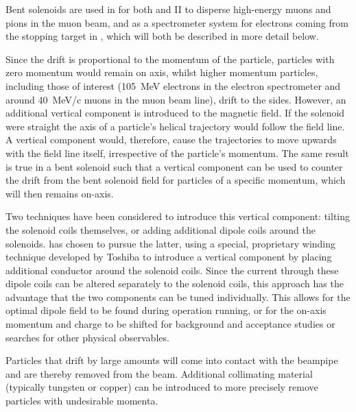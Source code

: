 Bent solenoids are used in \COMET for both \phaseI and II to disperse high-energy muons and pions in the muon
beam, and as a spectrometer system for electrons coming
from the stopping target in \phaseII, which will both be described in more
detail below.

Since the drift is proportional to the momentum of the particle, particles with zero momentum would remain on axis, whilst higher momentum particles, including those of interest (105~MeV electrons in the \phaseII electron spectrometer and around 40~MeV/c muons in the muon beam line), drift to the sides.  
However, an additional vertical component is introduced to the magnetic field.
If the solenoid were straight the axis of a particle's helical trajectory would follow the field line. 
A vertical component would, therefore, cause the trajectories to move upwards with the field line itself, irrespective of the particle's momentum.
The same result is true in a bent solenoid such that a vertical component can be used to 
counter the drift from the bent solenoid field for particles of a specific momentum, which will then remains on-axis.

Two techniques have been considered to introduce this vertical component: tilting the solenoid coils themselves, or adding additional dipole coils around the solenoids.
\COMET has chosen to pursue the latter, using a special, proprietary winding technique developed by Toshiba to introduce a vertical component by placing additional conductor around the solenoid coils.
Since the current through these dipole coils can be altered separately to the solenoid coils, this approach has the advantage that the two components can be tuned individually.
This allows for the optimal dipole field to be found during operation running, or for the on-axis momentum and charge to be shifted for background and acceptance studies or searches for other physical observables.

Particles that drift by large amounts will come into contact with the beampipe and are thereby removed from the beam.
Additional collimating material (typically tungsten or copper) can be introduced to more precisely remove particles with undesirable momenta.

